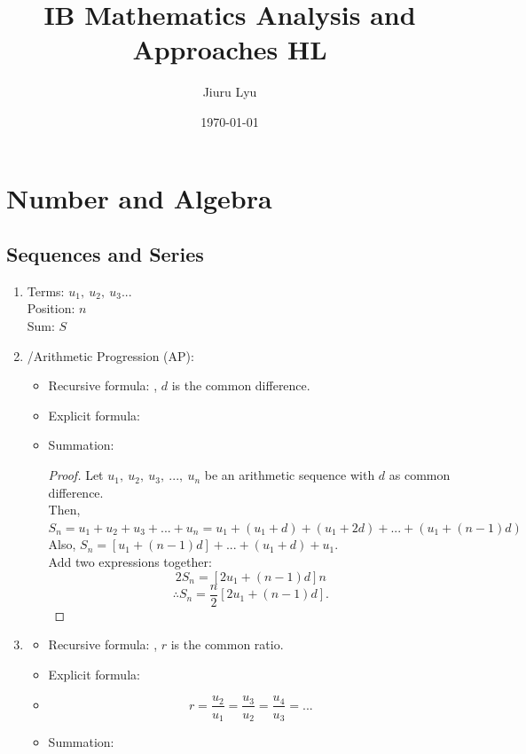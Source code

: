 \documentclass[12pt, a4paper]{article}
\title{\textbf{IB Mathematics Analysis and Approaches HL}}
\author{Jiuru Lyu}
\date{\today}
\newtheorem{proof}{Proof}[subsection]
\begin{document}
\maketitle
\tableofcontents

\newpage

\section{Number and Algebra}
\subsection{Sequences and Series}
\begin{enumerate}
\item Terms: $u_1,\ u_2,\ u_3...$\\Position: $n$\\Sum: $S$
\item \textbf{\color{red}{Arithmetic Sequence}}/Arithmetic Progression (AP): 
  \begin{itemize}
    \item Recursive formula: {}, $d$ is the common difference.
    \item Explicit formula: {\color{red}{$u_n=u_1+d(n-1)$}}
    \item Summation: {}
      \begin{proof}
        Let $u_1,\ u_2,\ u_3,\ ...,\ u_n$ be an arithmetic sequence with $d$ as common difference. \\
        Then, $S_n=u_1+u_2+u_3+...+u_n=u_1+(u_1+d)+(u_1+2d)+...+(u_1+(n-1)d)$\\
        Also, $S_n=[u_1+(n-1)d]+...+(u_1+d)+u_1.$\\
        Add two expressions together: 
        $$2S_n=[2u_1+(n-1)d]n$$
        $$\therefore S_n=\frac{n}{2}[2u_1+(n-1)d].$$ 
      \end{proof}
  \end{itemize}
\item {\textbf{\color{red}{Geometric Sequence}}}
  \begin{itemize}
    \item Recursive formula: {}, $r$ is the common ratio.
    \item Explicit formula: {}
    \item $$r=\frac{u_2}{u_1}=\frac{u_3}{u_2}=\frac{u_4}{u_3}=...$$
    \item Summation: {}

\end{itemize}
\end{enumerate}
\end{document}
